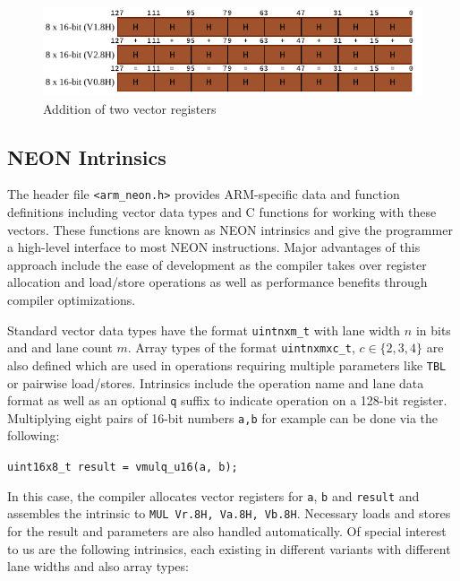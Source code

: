 \begin{figure}[h!]
    \centering
    \includegraphics[width=\textwidth]{Figures/vector_add.pdf}
    \caption{Addition of two vector registers}
\end{figure}

\subsection{NEON Intrinsics}

The header file \texttt{<arm\_neon.h>} provides ARM-specific data and function
definitions including vector data types and C functions for working with these
vectors. These functions are known as NEON intrinsics \cite{neonintr:2022} and
give the programmer a high-level interface to most NEON instructions. Major
advantages of this approach include the ease of development as the compiler
takes over register allocation and load/store operations as well as performance
benefits through compiler optimizations.

Standard vector data types have the format \texttt{uintnxm\_t} with lane width
$n$ in bits and and lane count $m$. Array types of the format
\texttt{uintnxmxc\_t}, $c\in\{2,3,4\}$ are also defined which are used in
operations requiring multiple parameters like \texttt{TBL} or pairwise
load/stores. Intrinsics include the operation name and lane data format as well
as an optional \texttt{q} suffix to indicate operation on a 128-bit register.
Multiplying eight pairs of 16-bit numbers \texttt{a,b} for example can be done
via the following:

\begin{center}
    \texttt{uint16x8\_t result = vmulq\_u16(a, b);}
\end{center}

In this case, the compiler allocates vector registers for \texttt{a},
\texttt{b} and \texttt{result} and assembles the intrinsic to \texttt{MUL
Vr.8H, Va.8H, Vb.8H}. Necessary loads and stores for the result and parameters
are also handled automatically. Of special interest to us are the following
intrinsics, each existing in different variants with different lane widths and
also array types: \\

